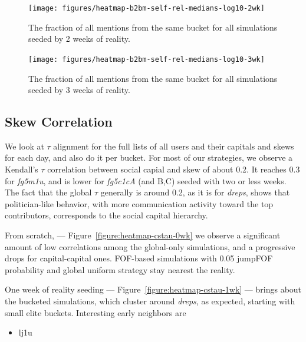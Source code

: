 \documentclass[10pt,oneside]{memoir}
\begin{document}
\begin{Spacing}{2}
\begin{figure}
\begin{center}
    \texttt{[image: figures/heatmap-b2bm-self-rel-medians-log10-2wk]}
    \caption{The fraction of all mentions from the same bucket for all simulations seeded by 2 weeks of reality.}
    \label{figure:heatmap-b2bm-self-rel-medians-2wk}
\end{center}
\end{figure}

\begin{figure}
\begin{center}
    \texttt{[image: figures/heatmap-b2bm-self-rel-medians-log10-3wk]}
    \caption{The fraction of all mentions from the same bucket for all simulations seeded by 3 weeks of reality.}
    \label{figure:heatmap-b2bm-self-rel-medians-3wk}
\end{center}
\end{figure}
\pagebreak \subsection{Skew Correlation}
\label{skewcorrelation}

We look at $\tau$ alignment for the full lists of all users and their capitals and skews for each day, and also do it per bucket. 
For most of our strategies, we observe a Kendall's $\tau$ correlation between social capial and skew of about 0.2.  It reaches 0.3 for {\itshape fg5m1u}, and is lower for {\itshape fg5c1cA} (and B,C) seeded with two or less weeks.
The fact that the global $\tau$ generally is around 0.2, as it is for {\itshape dreps}, shows that politician-like behavior, with more communication activity toward the top contributors, corresponds to the social capital hierarchy.


From scratch, --- Figure~\ref{figure:heatmap-cstau-0wk} we observe a significant amount of low correlations among the global-only simulations, and a progressive drops for capital-capital ones.  FOF-based simulations with 0.05 jumpFOF probability and global uniform strategy stay nearest the reality.


One week of reality seeding --- Figure~\ref{figure:heatmap-cstau-1wk} --- brings about the bucketed simulations, which cluster around {\itshape dreps}, as expected, starting with small elite buckets.  Interesting early neighbors are


\begin{itemize}


\item lj1u


\end{itemize}
\end{Spacing}
\end{document}
